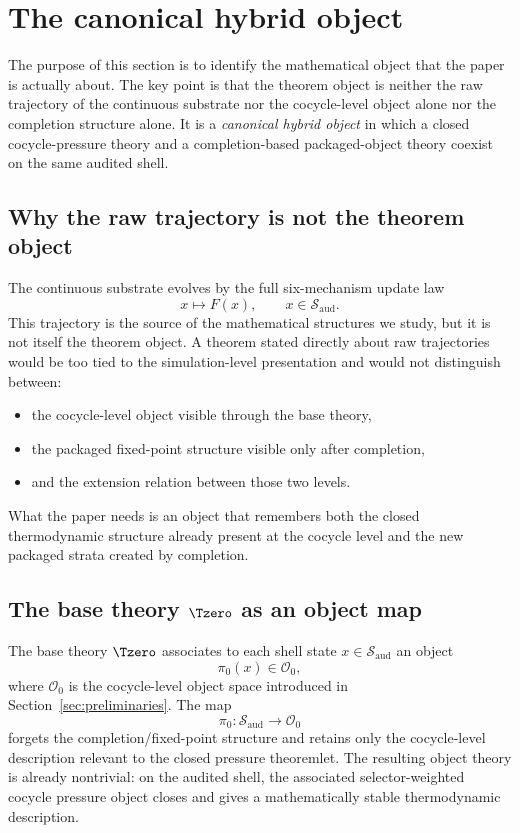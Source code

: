 \section{The canonical hybrid object}\label{sec:canonical-object}

The purpose of this section is to identify the mathematical object that the paper is actually about. The key point is that the theorem object is neither the raw trajectory of the continuous substrate nor the cocycle-level object alone nor the completion structure alone. It is a \emph{canonical hybrid object} in which a closed cocycle-pressure theory and a completion-based packaged-object theory coexist on the same audited shell.

\subsection{Why the raw trajectory is not the theorem object}

The continuous substrate evolves by the full six-mechanism update law
\[
x\mapsto F(x), \qquad x\in \mathcal{S}_{\mathrm{aud}}.
\]
This trajectory is the source of the mathematical structures we study, but it is not itself the theorem object. A theorem stated directly about raw trajectories would be too tied to the simulation-level presentation and would not distinguish between:
\begin{itemize}
    \item the cocycle-level object visible through the base theory,
    \item the packaged fixed-point structure visible only after completion,
    \item and the extension relation between those two levels.
\end{itemize}
What the paper needs is an object that remembers both the closed thermodynamic structure already present at the cocycle level and the new packaged strata created by completion.

\subsection{The base theory \texorpdfstring{$\Tzero$}{T0} as an object map}

The base theory \(\Tzero\) associates to each shell state \(x\in \mathcal{S}_{\mathrm{aud}}\) an object
\[
\pi_0(x)\in \mathcal{O}_0,
\]
where \(\mathcal{O}_0\) is the cocycle-level object space introduced in Section~\ref{sec:preliminaries}. The map
\[
\pi_0:\mathcal{S}_{\mathrm{aud}}\to \mathcal{O}_0
\]
forgets the completion/fixed-point structure and retains only the cocycle-level description relevant to the closed pressure theoremlet. The resulting object theory is already nontrivial: on the audited shell, the associated selector-weighted cocycle pressure object closes and gives a mathematically stable thermodynamic description.

